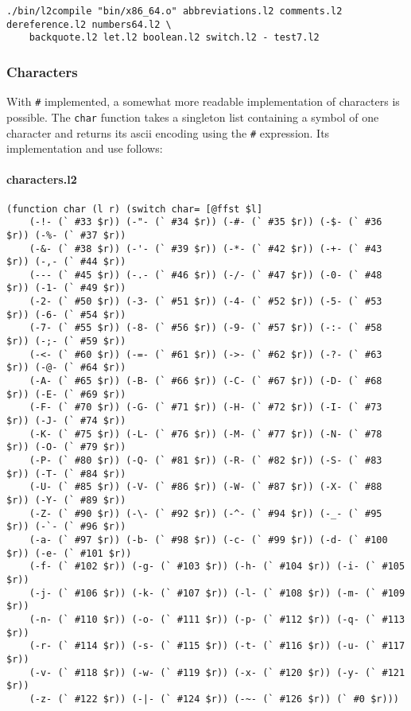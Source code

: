 \documentclass[]{article}
\let\oldparagraph\paragraph
\renewcommand{\paragraph}[1]{\oldparagraph{#1}\mbox{}}
\begin{document}
\begin{verbatim}
./bin/l2compile "bin/x86_64.o" abbreviations.l2 comments.l2 dereference.l2 numbers64.l2 \
    backquote.l2 let.l2 boolean.l2 switch.l2 - test7.l2
\end{verbatim}

\hypertarget{characters}{%
\subsubsection{Characters}\label{characters}}

With \texttt{\#} implemented, a somewhat more readable implementation of
characters is possible. The \texttt{char} function takes a singleton
list containing a symbol of one character and returns its ascii encoding
using the \texttt{\#} expression. Its implementation and use follows:

\hypertarget{characters.l2}{%
\paragraph{characters.l2}\label{characters.l2}}

\begin{verbatim}
(function char (l r) (switch char= [@ffst $l]
    (-!- (` #33 $r)) (-"- (` #34 $r)) (-#- (` #35 $r)) (-$- (` #36 $r)) (-%- (` #37 $r))
    (-&- (` #38 $r)) (-'- (` #39 $r)) (-*- (` #42 $r)) (-+- (` #43 $r)) (-,- (` #44 $r))
    (--- (` #45 $r)) (-.- (` #46 $r)) (-/- (` #47 $r)) (-0- (` #48 $r)) (-1- (` #49 $r))
    (-2- (` #50 $r)) (-3- (` #51 $r)) (-4- (` #52 $r)) (-5- (` #53 $r)) (-6- (` #54 $r))
    (-7- (` #55 $r)) (-8- (` #56 $r)) (-9- (` #57 $r)) (-:- (` #58 $r)) (-;- (` #59 $r))
    (-<- (` #60 $r)) (-=- (` #61 $r)) (->- (` #62 $r)) (-?- (` #63 $r)) (-@- (` #64 $r))
    (-A- (` #65 $r)) (-B- (` #66 $r)) (-C- (` #67 $r)) (-D- (` #68 $r)) (-E- (` #69 $r))
    (-F- (` #70 $r)) (-G- (` #71 $r)) (-H- (` #72 $r)) (-I- (` #73 $r)) (-J- (` #74 $r))
    (-K- (` #75 $r)) (-L- (` #76 $r)) (-M- (` #77 $r)) (-N- (` #78 $r)) (-O- (` #79 $r))
    (-P- (` #80 $r)) (-Q- (` #81 $r)) (-R- (` #82 $r)) (-S- (` #83 $r)) (-T- (` #84 $r))
    (-U- (` #85 $r)) (-V- (` #86 $r)) (-W- (` #87 $r)) (-X- (` #88 $r)) (-Y- (` #89 $r))
    (-Z- (` #90 $r)) (-\- (` #92 $r)) (-^- (` #94 $r)) (-_- (` #95 $r)) (-`- (` #96 $r))
    (-a- (` #97 $r)) (-b- (` #98 $r)) (-c- (` #99 $r)) (-d- (` #100 $r)) (-e- (` #101 $r))
    (-f- (` #102 $r)) (-g- (` #103 $r)) (-h- (` #104 $r)) (-i- (` #105 $r))
    (-j- (` #106 $r)) (-k- (` #107 $r)) (-l- (` #108 $r)) (-m- (` #109 $r))
    (-n- (` #110 $r)) (-o- (` #111 $r)) (-p- (` #112 $r)) (-q- (` #113 $r))
    (-r- (` #114 $r)) (-s- (` #115 $r)) (-t- (` #116 $r)) (-u- (` #117 $r))
    (-v- (` #118 $r)) (-w- (` #119 $r)) (-x- (` #120 $r)) (-y- (` #121 $r))
    (-z- (` #122 $r)) (-|- (` #124 $r)) (-~- (` #126 $r)) (` #0 $r)))
\end{verbatim}
\end{document}
